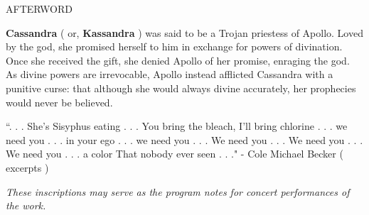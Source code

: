 \documentclass[11pt]{article}
\begin{document}
\vspace*{16\baselineskip}

\begingroup
\begin{center}
\huge AFTERWORD
\end{center}
\endgroup

\vspace*{3\baselineskip}

\begingroup
\textbf{Cassandra} ( or, \textbf{Kassandra} ) was said to be a Trojan priestess of Apollo. Loved by the god, she promised herself to him in exchange for powers of divination. Once she received the gift, she denied Apollo of her promise, enraging the god. As divine powers are irrevocable, Apollo instead afflicted Cassandra with a punitive curse: that although she would always divine accurately, her prophecies would never be believed. 	
\endgroup

\vspace*{2\baselineskip}

\begingroup
``. . . She's Sisyphus eating . . . You bring the bleach, I'll bring chlorine . . . we need you . . . in your ego . . . we need you . . . We need you . . . We need you . . . We need you . . . a color That nobody ever seen . . ."  -  Cole Michael Becker ( excerpts ) 
\endgroup

\vspace*{40\baselineskip}

\begingroup
\begin{center}
\textit{These inscriptions may serve as the program notes for concert performances of the work.}	
\end{center}
\endgroup
\end{document}
